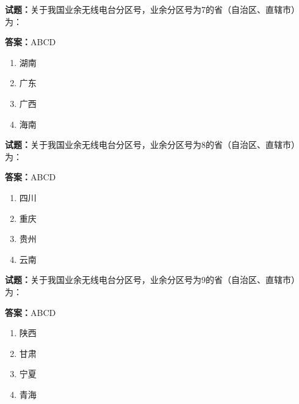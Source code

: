 \documentclass{ctexbook}
\begin{document}




\vspace{1em}

\textbf{试题：}关于我国业余无线电台分区号，业余分区号为7的省（自治区、直辖市）为： 

\textbf{答案：}ABCD 

\begin{enumerate}[leftmargin=3em]
  \item 湖南 

  \item 广东 

  \item 广西 

  \item 海南 

\end{enumerate}





\vspace{1em}

\textbf{试题：}关于我国业余无线电台分区号，业余分区号为8的省（自治区、直辖市）为： 

\textbf{答案：}ABCD 

\begin{enumerate}[leftmargin=3em]
  \item 四川 

  \item 重庆 

  \item 贵州 

  \item 云南 

\end{enumerate}





\vspace{1em}

\textbf{试题：}关于我国业余无线电台分区号，业余分区号为9的省（自治区、直辖市）为： 

\textbf{答案：}ABCD 

\begin{enumerate}[leftmargin=3em]
  \item 陕西 

  \item 甘肃 

  \item 宁夏 

  \item 青海 

\end{enumerate}
\end{document}
